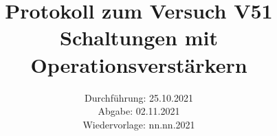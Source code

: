 \titlehead{\texttt{[image: ressources/logo.jpg]}}
\title{Protokoll zum Versuch V51 \\ Schaltungen mit Operationsverstärkern}
\date{Durchführung: 25.10.2021 \\ Abgabe: 02.11.2021 \\ Wiedervorlage: nn.nn.2021}

